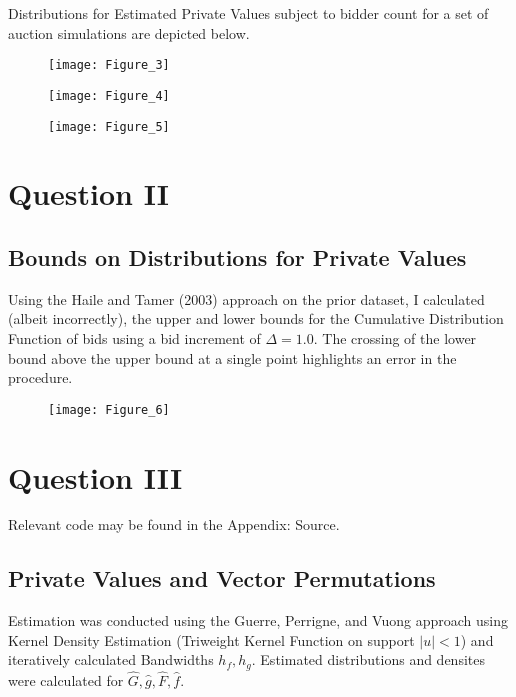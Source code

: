 \documentclass{article}
\begin{document}
Distributions for Estimated Private Values subject to bidder count for a set of auction simulations are depicted below.

\begin{figure}[h]
  \centering
    \texttt{[image: Figure\_3]}
\end{figure}
\FloatBarrier
\begin{figure}[h]
  \centering
    \texttt{[image: Figure\_4]}
\end{figure}
\FloatBarrier
\begin{figure}[h]
  \centering
    \texttt{[image: Figure\_5]}
\end{figure}
\FloatBarrier

\newpage

\section{Question II}

\subsection{Bounds on Distributions for Private Values}

Using the Haile and Tamer (2003) approach on the prior dataset, I calculated (albeit incorrectly), the upper and lower bounds for the Cumulative Distribution Function of bids using a bid increment of $\Delta=1.0$. The crossing of the lower bound above the upper bound at a single point highlights an error in the procedure.

\begin{figure}[h]
  \centering
    \texttt{[image: Figure\_6]}
\end{figure}
\FloatBarrier

\newpage

\section{Question III}

Relevant code may be found in the Appendix: Source.

\subsection{Private Values and Vector Permutations}

Estimation was conducted using the Guerre, Perrigne, and Vuong approach using Kernel Density Estimation (Triweight Kernel Function on support $|u|<1$) and iteratively calculated Bandwidths $h_f, h_g$. Estimated distributions and densites were calculated for $\hat{G}, \hat{g}, \hat{F}, \hat{f}$.
\end{document}
